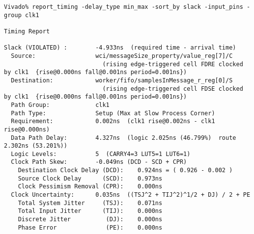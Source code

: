 \documentclass{article}
\begin{document}
\begin{lstlisting}
Vivado% report_timing -delay_type min_max -sort_by slack -input_pins -group clk1

Timing Report

Slack (VIOLATED) :        -4.933ns  (required time - arrival time)
  Source:                 wci/messageSize_property/value_reg[7]/C
                            (rising edge-triggered cell FDRE clocked by clk1  {rise@0.000ns fall@0.001ns period=0.001ns})
  Destination:            worker/fifo/samplesInMessage_r_reg[0]/S
                            (rising edge-triggered cell FDSE clocked by clk1  {rise@0.000ns fall@0.001ns period=0.001ns})
  Path Group:             clk1
  Path Type:              Setup (Max at Slow Process Corner)
  Requirement:            0.002ns  (clk1 rise@0.002ns - clk1 rise@0.000ns)
  Data Path Delay:        4.327ns  (logic 2.025ns (46.799%)  route 2.302ns (53.201%))
  Logic Levels:           5  (CARRY4=3 LUT5=1 LUT6=1)
  Clock Path Skew:        -0.049ns (DCD - SCD + CPR)
    Destination Clock Delay (DCD):    0.924ns = ( 0.926 - 0.002 ) 
    Source Clock Delay      (SCD):    0.973ns
    Clock Pessimism Removal (CPR):    0.000ns
  Clock Uncertainty:      0.035ns  ((TSJ^2 + TIJ^2)^1/2 + DJ) / 2 + PE
    Total System Jitter     (TSJ):    0.071ns
    Total Input Jitter      (TIJ):    0.000ns
    Discrete Jitter          (DJ):    0.000ns
    Phase Error              (PE):    0.000ns


\end{lstlisting}
\end{document}
